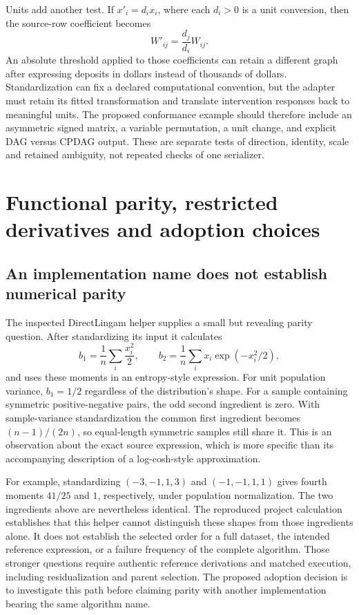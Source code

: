 Units add another test. If \(x'_i=d_i x_i\), where each \(d_i>0\) is a
unit conversion, then the source-row coefficient becomes \[
 W'_{ij}=\frac{d_j}{d_i}W_{ij}.
\] An absolute threshold applied to those coefficients can retain a
different graph after expressing deposits in dollars instead of
thousands of dollars. Standardization can fix a declared computational
convention, but the adapter must retain its fitted transformation and
translate intervention responses back to meaningful units. The proposed
conformance example should therefore include an asymmetric signed
matrix, a variable permutation, a unit change, and explicit DAG versus
CPDAG output. These are separate tests of direction, identity, scale and
retained ambiguity, not repeated checks of one serializer.

\hypertarget{functional-parity-restricted-derivatives-and-adoption-choices}{%
\section{Functional parity, restricted derivatives and adoption
choices}\label{functional-parity-restricted-derivatives-and-adoption-choices}}

\hypertarget{an-implementation-name-does-not-establish-numerical-parity}{%
\subsection{An implementation name does not establish numerical
parity}\label{an-implementation-name-does-not-establish-numerical-parity}}

The inspected DirectLingam helper supplies a small but revealing parity
question. After standardizing its input it calculates \[
 b_1=\frac1n\sum_i\frac{x_i^2}{2},\qquad
 b_2=\frac1n\sum_i x_i\exp(-x_i^2/2),
\] and uses these moments in an entropy-style expression. For unit
population variance, \(b_1=1/2\) regardless of the distribution's shape.
For a sample containing symmetric positive-negative pairs, the odd
second ingredient is zero. With sample-variance standardization the
common first ingredient becomes \((n-1)/(2n)\), so equal-length
symmetric samples still share it. This is an observation about the exact
source expression, which is more specific than its accompanying
description of a log-cosh-style approximation.
\citep{exec13_java_tetrad}

For example, standardizing \((-3,-1,1,3)\) and \((-1,-1,1,1)\) gives
fourth moments \(41/25\) and \(1\), respectively, under population
normalization. The two ingredients above are nevertheless identical. The
reproduced project calculation establishes that this helper cannot
distinguish these shapes from those ingredients alone. It does not
establish the selected order for a full dataset, the intended reference
expression, or a failure frequency of the complete algorithm. Those
stronger questions require authentic reference derivations and matched
execution, including residualization and parent selection. The proposed
adoption decision is to investigate this path before claiming parity
with another implementation bearing the same algorithm name.
\citep{exec13_java_examples,exec13_java_tetrad}

